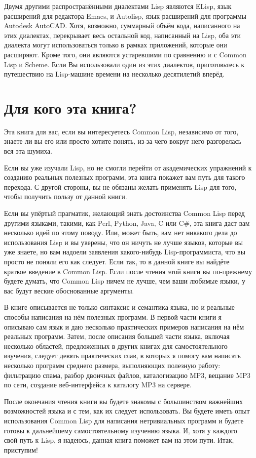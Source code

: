 Двумя другими распространёнными диалектами Lisp являются ELisp, язык расширений для
редактора Emacs, и Autolisp, язык расширений для программы Autodesk AutoCAD. Хотя,
возможно, суммарный объём кода, написанного на этих диалектах, перекрывает весь остальной
код, написанный на Lisp, оба эти диалекта могут использоваться только в рамках приложений,
которые они расширяют. Кроме того, они являются устаревшими по сравнению и с Common Lisp и
Scheme. Если Вы использовали один из этих диалектов, приготовьтесь к путешествию на
Lisp-машине времени на несколько десятилетий вперёд.

\section{Для кого эта книга?}

Эта книга для вас, если вы интересуетесь Common Lisp, независимо от
того, знаете ли вы его или просто хотите понять, из-за чего вокруг него разгорелась вся
эта шумиха.

Если вы уже изучали Lisp, но не смогли перейти от академических упражнений к созданию
реальных полезных программ, эта книга покажет вам путь для такого перехода. С другой
стороны, вы не обязаны желать применять Lisp для того, чтобы получить пользу от данной
книги.

Если вы упёртый прагматик, желающий знать достоинства Common Lisp перед другими языками,
такими, как Perl, Python, Java, C или C\#, эта книга даст вам несколько идей по этому
поводу. Или, может быть, вам нет никакого дела до использования Lisp и вы уверены, что он
ничуть не лучше языков, которые вы уже знаете, но вам надоели заявления какого-нибудь
Lisp-программиста, что вы просто не поняли его как следует. Если так, то в данной книге вы
найдёте краткое введение в Common Lisp. Если после чтения этой книги вы по-прежнему будете
думать, что Common Lisp ничем не лучше, чем ваши любимые языки, у вас будут веские
обоснованные аргументы.

В книге описывается не только синтаксис и семантика языка, но и реальные способы написания
на нём полезных программ. В первой части книги я описываю сам язык и даю несколько
практических примеров написания на нём реальных программ. Затем, после описания большей
части языка, включая несколько областей, предложенных в других книгах для самостоятельного
изучения, следует девять практических глав, в которых я помогу вам написать несколько
программ среднего размера, выполняющих полезную работу: фильтрацию спама, разбор двоичных
файлов, каталогизацию MP3, вещание MP3 по сети, создание веб-интерфейса к каталогу MP3 на
сервере.

После окончания чтения книги вы будете знакомы с большинством важнейших возможностей языка
и с тем, как их следует использовать. Вы будете иметь опыт использования Common Lisp для
написания нетривиальных программ и будете готовы к дальнейшему самостоятельному изучению
языка. И, хотя у каждого свой путь к Lisp, я надеюсь, данная книга поможет вам на этом
пути. Итак, приступим!

